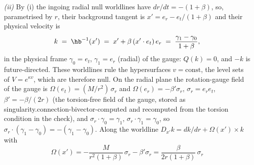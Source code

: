 \emph{(ii)} By (i) the ingoing radial null worldlines have $dr/dt = -(1 + \beta)$, so, parametrised by $r$, their background tangent is $x' = e_{r} - e_{t}/(1 + \beta)$ and their physical velocity is
\[
k \;=\; \hb^{-1}(x') \;=\; x' + \beta\,(x' \cdot e_{t})\,e_{r} \;=\; \frac{\gamma_{1} - \gamma_{0}}{1 + \beta},
\]
in the physical frame $\gamma_{0} = e_{t}$, $\gamma_{1} = e_{r}$ (radial) of the gauge: $Q(k) = 0$, and $-k$ is future-directed. These worldlines rule the hypersurfaces $v = \mathrm{const}$, the level sets of $V = e^{\kappa v}$, which are therefore null. On the radial plane the rotation-gauge field of the gauge is $\Omega(e_{t}) = (M/r^{2})\,\sigma_{r}$ and $\Omega(e_{r}) = -\beta'\sigma_{r}$, $\sigma_{r} = e_{r}e_{t}$, $\beta' = -\beta/(2r)$ (the torsion-free field of the gauge, stored as singularity.connection-bivector-computed and recomputed from the torsion condition in the check), and $\sigma_{r} \cdot \gamma_{0} = \gamma_{1}$, $\sigma_{r} \cdot \gamma_{1} = \gamma_{0}$, so $\sigma_{r} \cdot (\gamma_{1} - \gamma_{0}) = -(\gamma_{1} - \gamma_{0})$. Along the worldline $D_{x'}k = dk/dr + \Omega(x') \times k$ with
\[
\Omega(x') = -\frac{M}{r^{2}(1 + \beta)}\,\sigma_{r} - \beta'\sigma_{r} = \frac{\beta}{2r(1 + \beta)}\,\sigma_{r}
\]
